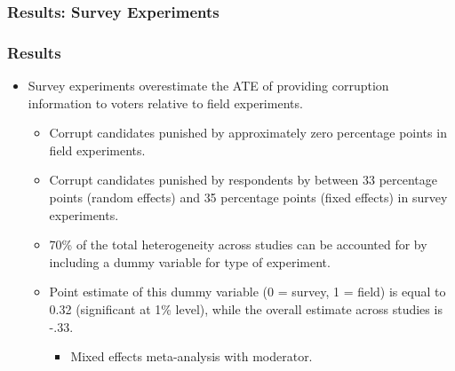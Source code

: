 \documentclass[usenames,dvipsnames]{beamer}
\begin{document}
\begin{frame}
\frametitle{Results: Survey Experiments}


\end{frame}


\begin{frame}
\frametitle{Results}
\begin{itemize}
\item Survey experiments overestimate the ATE of providing corruption information to voters relative to field experiments.
\pause
\begin{itemize}
\item Corrupt candidates punished by approximately \textcolor{Cerulean}{zero percentage points} in field experiments.
\pause
\item Corrupt candidates punished by respondents by between \textcolor{Cerulean}{33 percentage points} (random effects) and \textcolor{Cerulean}{35 percentage points} (fixed effects) in survey experiments.
\pause
\item 70\% of the total heterogeneity across studies can be accounted for by including a dummy variable for type of experiment.
\pause
\item Point estimate of this dummy variable (0 = survey, 1 = field) is equal to 0.32 (significant at 1\% level), while the overall estimate across studies is -.33. 
\begin{itemize}
\item Mixed effects meta-analysis with moderator. 
\end{itemize}
\end{itemize}
\end{itemize}
\end{frame}
\end{document}
